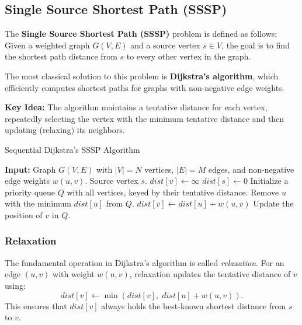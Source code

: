 \documentclass[12pt]{book}
\begin{document}
\subsection{Single Source Shortest Path (SSSP)}

The \textbf{Single Source Shortest Path (SSSP)} problem is defined as follows:  
Given a weighted graph $G(V,E)$ and a source vertex $s \in V$, the goal is to find the shortest path distance from $s$ to every other vertex in the graph.  

The most classical solution to this problem is \textbf{Dijkstra's algorithm}, which efficiently computes shortest paths for graphs with non-negative edge weights.

\medskip
\noindent
\textbf{Key Idea:}  
The algorithm maintains a tentative distance for each vertex, repeatedly selecting the vertex with the minimum tentative distance and then updating (relaxing) its neighbors.  

\begin{algorithm}[H]
\caption{Sequential Dijkstra's SSSP Algorithm}
\label{alg:Dijkstra}
\begin{algorithmic}[1]
\State \textbf{Input:} Graph $G(V,E)$ with $|V| = N$ vertices, $|E| = M$ edges, and non-negative edge weights $w(u,v)$. Source vertex $s$.
    \State $dist[v] \gets \infty$
\EndFor
\State $dist[s] \gets 0$
\State Initialize a priority queue $Q$ with all vertices, keyed by their tentative distance.
    \State Remove $u$ with the minimum $dist[u]$ from $Q$.
            \State $dist[v] \gets dist[u] + w(u,v)$
            \State Update the position of $v$ in $Q$.
        \EndIf
    \EndFor
\EndWhile
\end{algorithmic}
\end{algorithm}

\subsubsection*{Relaxation}
The fundamental operation in Dijkstra's algorithm is called \emph{relaxation}.  
For an edge $(u,v)$ with weight $w(u,v)$, relaxation updates the tentative distance of $v$ using:
\[
dist[v] \gets \min(dist[v], \; dist[u] + w(u,v)).
\]
This ensures that $dist[v]$ always holds the best-known shortest distance from $s$ to $v$.
\end{document}
